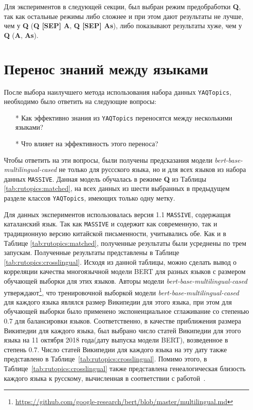 Для экспериментов в следующей секции, был выбран режим предобработки \textbf{Q}, так как остальные режимы либо сложнее и при этом дают результаты не лучше, чем у \textbf{Q} (\textbf{Q [SEP] A}, \textbf{Q [SEP] As}), либо показывают результаты хуже, чем у \textbf{Q} (\textbf{A}, \textbf{As}).





\section{Перенос знаний между языками}
После выбора наилучшего метода использования набора данных \texttt{YAQTopics}, необходимо было ответить на следующие вопросы:
\begin{itemize}
\item[*]Как эффективно знания из \texttt{YAQTopics} переносятся между несколькими языками?
\item[*]Что влияет на эффективность этого переноса?
\end{itemize}
Чтобы ответить на эти вопросы, были получены предсказания модели \textit{bert-base-multilingual-cased} не только для руссского языка, но и для всех языков из набора данных \texttt{MASSIVE}. Данная модель обучалась в режиме \textbf{Q} из Таблицы \ref{tab:rutopics:matched}, на всех данных из шести выбранных в предыдущем разделе классов \texttt{YAQTopics}, имеющих только одну метку. 

Для данных экспериментов использовалась версия 1.1 \texttt{MASSIVE}, содержащая каталанский язык. Так как \texttt{MASSIVE} и содержит как современную, так и традиционную версию китайской письменности, учитывались обе. Как и в Таблице \ref{tab:rutopics:matched}, полученные результаты были усреднены по трем запускам.
Полученные результаты представлены в Таблице \ref{tab:rutopics:crosslingual}. Исходя из данной таблицы, можно сделать вывод о корреляции качества многоязычной модели BERT для разных языков с размером обучающей выборки для этих языков. Авторы модели \textit{bert-base-multilingual-cased} утверждают\footnote{\url{https://github.com/google-research/bert/blob/master/multilingual.md}}, что тренировочной выборкой модели \textit{bert-base-multilingual-cased} для каждого языка являлся размер Википедии для этого языка, при этом для обучающей выборки было применено экспоненциальное сглаживание со степенью 0.7 для балансировки языков.
Соответственно, в качестве приближения размера Википедии для каждого языка, был выбрано число статей Википедии для этого языка на 11 октября 2018 года(дату выпуска модели BERT), возведенное в степень 0.7.  Число статей Википедии для каждого языка на эту дату также представлено в Таблице~\ref{tab:rutopics:crosslingual}. Помимо этого, в Таблице~\ref{tab:rutopics:crosslingual} также представлена генеалогическая близость каждого языка к русскому, вычисленная в соответствии с работой~\cite{lang_sim}. 

